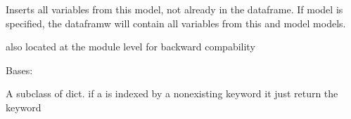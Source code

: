 \documentclass[letterpaper,10pt,english]{sphinxmanual}
\begin{document}
\begin{fulllineitems}
\begin{fulllineitems}
\end{fulllineitems}


\begin{fulllineitems}
\label{\detokenize{core/modelclass:modelclass.Model_help_Mixin.insertModelVar}}
\pysigstartsignatures
{}
\pysigstopsignatures
\sphinxAtStartPar
Inserts all variables from this model, not already in the dataframe.
If model is specified, the dataframw will contain all variables from this and model models.

\sphinxAtStartPar
also located at the module level for backward compability

\end{fulllineitems}


\begin{fulllineitems}
\label{\detokenize{core/modelclass:modelclass.Model_help_Mixin.in_notebook}}
\pysigstartsignatures
{}
\pysigstopsignatures
\end{fulllineitems}


\begin{fulllineitems}
\label{\detokenize{core/modelclass:modelclass.Model_help_Mixin.defsub}}
\pysigstartsignatures
{}
\pysigstopsignatures
\sphinxAtStartPar
Bases: 

\sphinxAtStartPar
A subclass of dict.
if a  is indexed by a nonexisting keyword it just return the keyword

\end{fulllineitems}



\end{fulllineitems}
\end{document}
